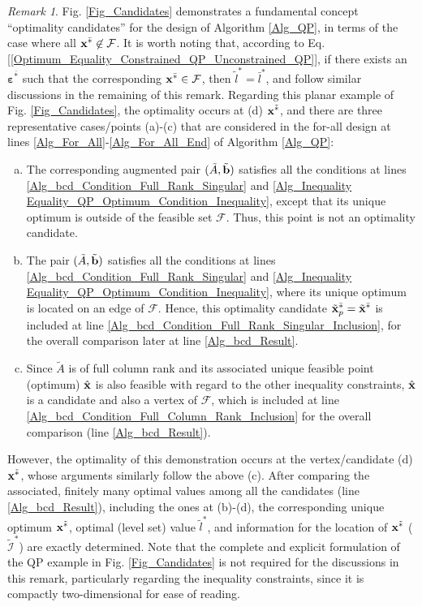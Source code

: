 \documentclass[9pt,twocolumn,twoside,lineno]{pnas-new-1}
\newcommand{\bfb}{{\bf b}}
\newcommand{\bfx}{{\bf x}}
\newcommand{\bfvarepsilon}{{\boldsymbol \varepsilon}}
\newcommand{\calF}{{\mathcal F}}
\newcommand{\calI}{{\mathcal I}}
\theoremstyle{remark}
\newtheorem{remark}{Remark}[section]
\begin{document}
\begin{remark}
Fig. \ref{Fig_Candidates} demonstrates a fundamental concept ``optimality candidates'' for the design of Algorithm \ref{Alg_QP}, in terms of the case where all $\bfx^{\bar *}\not\in\calF$. It is worth noting that, according to Eq. [\ref{Optimum_Equality_Constrained_QP_Unconstrained_QP}], if there exists an $\bfvarepsilon^{\bar *}$ such that the corresponding $\bfx^{\bar *}\in\calF$, then $\tilde l^*=\bar l^*$, and follow similar discussions in the remaining of this remark. Regarding this planar example of Fig. \ref{Fig_Candidates}, the optimality occurs at (d) $\bfx^{\tilde *}$, and there are three representative cases/points (a)-(c) that are considered in the for-all design at lines \ref{Alg_For_All}-\ref{Alg_For_All_End} of Algorithm \ref{Alg_QP}:
\begin{enumerate}[a)]
\item The corresponding augmented pair $(\tilde A,\tilde\bfb)$ satisfies all the conditions at lines \ref{Alg_bcd_Condition_Full_Rank_Singular} and \ref{Alg_Inequality Equality_QP_Optimum_Condition_Inequality}, except that its unique optimum is outside of the feasible set $\calF$. Thus, this point is not an optimality candidate.
\item The pair $(\tilde A, \tilde\bfb)$ satisfies all the conditions at lines \ref{Alg_bcd_Condition_Full_Rank_Singular} and \ref{Alg_Inequality Equality_QP_Optimum_Condition_Inequality}, where its unique optimum is located on an edge of $\calF$. Hence, this optimality candidate $\tilde\bfx_p^{\bar *}=\tilde\bfx^{\bar *}$ is included at line \ref{Alg_bcd_Condition_Full_Rank_Singular_Inclusion}, for the overall comparison later at line \ref{Alg_bcd_Result}.
\item Since $\tilde A$ is of full column rank and its associated unique feasible point (optimum) $\hat\bfx$ is also feasible with regard to the other inequality constraints, $\hat\bfx$ is a candidate and also a vertex of $\calF$, which is included at line \ref{Alg_bcd_Condition_Full_Column_Rank_Inclusion} for the overall comparison (line \ref{Alg_bcd_Result}).
\end{enumerate}
However, the optimality of this demonstration occurs at the vertex/candidate (d) $\bfx^{\tilde *}$, whose arguments similarly follow the above (c). After comparing the associated, finitely many optimal values among all the candidates (line \ref{Alg_bcd_Result}), including the ones at (b)-(d), the corresponding unique optimum $\bfx^{\tilde *}$, optimal (level set) value $\tilde l^*$, and information for the location of $\bfx^{\tilde *}$ ($\tilde\calI^*$) are exactly determined. Note that the complete and explicit formulation of the QP example in Fig. \ref{Fig_Candidates} is not required for the discussions in this remark, particularly regarding the inequality constraints, since it is compactly two-dimensional for ease of reading.
\label{Rem_Candidates}
\end{remark}
\end{document}
